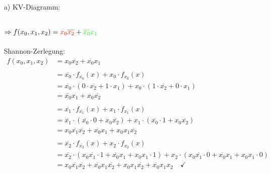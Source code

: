 \documentclass{article}
\newcommand{\nyet}{\overline}
\begin{document}
	\begin{enumerate}
		\item[a)]KV-Diagramm:\\
		\begin{karnaugh-map}[4][2][1][$x_2, x_0$][$x_1$]
		\end{karnaugh-map}\\
		$\Rightarrow f(x_0, x_1, x_2) = \textcolor{red}{x_0 \nyet{x_2}} + \textcolor{green}{\nyet{x_0} x_1}$ \\\\
		Shannon-Zerlegung:
		\begin{align*}
			f(x_0, x_1, x_2) &= x_0 \nyet{x_2} + \nyet{x_0} x_1 \\\\
			&= \nyet{x_0} \cdot f_{\nyet{x_0}}(x) + x_0 \cdot f_{x_0}(x) \\
			&= \nyet{x_0} \cdot (0 \cdot \nyet{x_2} + 1 \cdot x_1) + x_0 \cdot (1 \cdot \nyet{x_2} + 0 \cdot x_1) \\
			&= \nyet{x_0} x_1 + x_0 \nyet{x_2} \\\\
			&= \nyet{x_1} \cdot f_{\nyet{x_1}}(x) + x_1 \cdot f_{x_1}(x) \\
			&= \nyet{x_1} \cdot (\nyet{x_0} \cdot 0 + x_0 \nyet{x_2}) + x_1 \cdot (\nyet{x_0} \cdot 1 + x_0 \nyet{x_2}) \\
			&= x_0 \nyet{x_1} \nyet{x_2} + \nyet{x_0} x_1 + x_0 x_1 \nyet{x_2} \\\\
			&= \nyet{x_2} \cdot f_{\nyet{x_2}}(x) + x_2 \cdot f_{x_2}(x) \\
			&= \nyet{x_2} \cdot (x_0 \nyet{x_1} \cdot 1 + \nyet{x_0} x_1 + x_0 x_1 \cdot 1) + x_2 \cdot (x_0 \nyet{x_1} \cdot 0 + \nyet{x_0} x_1 + x_0 x_1 \cdot 0) \\
			&= x_0 \nyet{x_1} \nyet{x_2} + \nyet{x_0} x_1 \nyet{x_2} + x_0 x_1 \nyet{x_2} + \nyet{x_0} x_1 x_2 \quad \checkmark
		\end{align*}


\end{enumerate}
\end{document}
